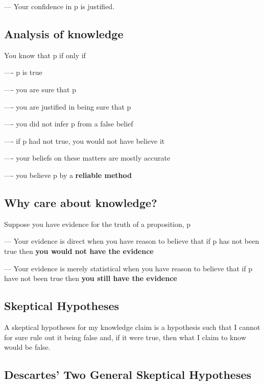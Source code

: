 \documentclass{book}
\begin{document}
--- Your confidence in p is justified.

\subsection{Analysis of knowledge}
 You know that p if only if
 
 ---- p is true
 
 ---- you are sure that p
 
 ---- you are justified in being sure that p
 
 ---- you did not infer p from a false belief
 
 ---- if p had not true, you would not have believe it
 
 ---- your beliefs on these matters are mostly accurate
 
 ---- you believe p by a \textbf{reliable method}
 
 \subsection {Why care about knowledge?}
 
 Suppose you have evidence for the truth of a proposition, p
 
 --- Your evidence is direct when you have reason to believe that if p has not been true then \textbf{you would not have the evidence}
 
 --- Your evidence is merely statistical when you have reason to believe that if p have not been true then \textbf{you still have the evidence}
 
 \subsection{Skeptical Hypotheses}
 A skeptical hypotheses for my knowledge claim is a hypothesis such that I cannot for sure rule out it being false and, if it were true, then what I claim to know would be false.
 
 \subsection{Descartes' Two General Skeptical Hypotheses}
   
 
\end{document}
